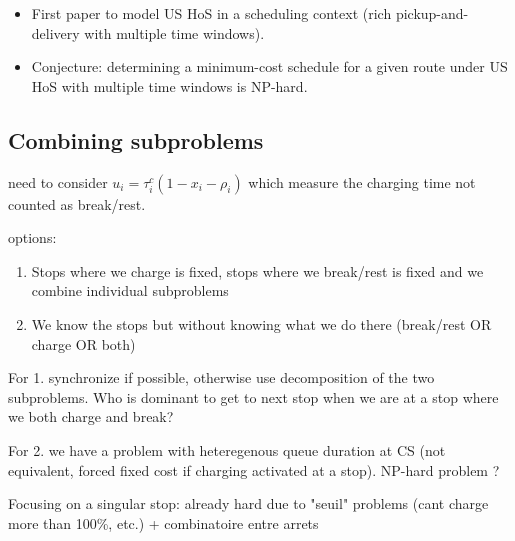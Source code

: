 \documentclass[preprint,12pt,3p]{elsarticle}
\begin{document}
{\noindent \citep{xu_solving_2003}
\begin{itemize}
    \item First paper to model US HoS in a scheduling context (rich pickup-and-delivery with multiple time windows).
    \item  Conjecture: determining a minimum-cost schedule for a given route under US HoS with multiple time windows is NP-hard.
\end{itemize}




\subsection{Combining subproblems}

need to consider $u_i=\tau_i^c(1-x_i-\rho_i)$ which measure the charging time not counted as break/rest.

\noindent options:
\begin{enumerate}
    \item Stops where we charge is fixed, stops where we break/rest is fixed and we combine individual subproblems
    \item We know the stops but without knowing what we do there (break/rest OR charge OR both)
\end{enumerate}

For 1. synchronize if possible, otherwise use decomposition of the two subproblems. Who is dominant to get to next stop when we are at a stop where we both charge and break?

For 2. we have a problem with heteregenous queue duration at CS (not equivalent, forced fixed cost if charging activated at a stop). NP-hard problem ?

Focusing on a singular stop: already hard due to "seuil" problems (cant charge more than 100\%, etc.) + combinatoire entre arrets

}
\end{document}
